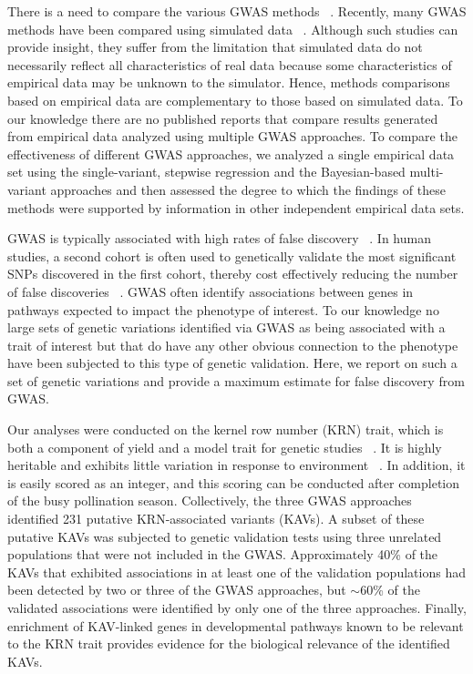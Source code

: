 \documentclass[10pt,letterpaper]{article}
\begin{document}
There is a need to compare the various GWAS methods ~\cite{Bush2012}.  Recently, many GWAS methods have been compared using simulated data ~\cite{Galesloot2014}. Although such studies can provide insight, they suffer from the limitation that simulated data do not necessarily reflect all characteristics of real data because some characteristics of empirical data may be unknown to the simulator. Hence, methods comparisons based on empirical data are complementary to those based on simulated data. To our knowledge there are no published reports that compare results generated from empirical data analyzed using multiple GWAS approaches. To compare the effectiveness of different GWAS approaches, we analyzed a single empirical data set using the single-variant, stepwise regression and the Bayesian-based multi-variant approaches and then assessed the degree to which the findings of these methods were supported by information in other independent empirical data sets.

GWAS is typically associated with high rates of false discovery ~\cite{Visscher2012}. In human studies, a second cohort is often used to genetically validate the most significant SNPs discovered in the first cohort, thereby cost effectively reducing the number of false discoveries ~\cite{Sladek2007}. GWAS often identify associations between genes in pathways expected to impact the phenotype of interest. To our knowledge no large sets of genetic variations identified via GWAS as being associated with a trait of interest but that do have any other obvious connection to the phenotype have been subjected to this type of genetic validation. Here, we report on such a set of genetic variations and provide a maximum estimate for false discovery from GWAS.  

Our analyses were conducted on the kernel row number (KRN) trait, which is both a component of yield and a model trait for genetic studies ~\cite{hallauer2010quantitative}. It is highly heritable and exhibits little variation in response to environment ~\cite{Lu2011}. In addition, it is easily scored as an integer, and this scoring can be conducted after completion of the busy pollination season. Collectively, the three GWAS approaches identified 231 putative KRN-associated variants (KAVs). A subset of these putative KAVs was subjected to genetic validation tests using three unrelated populations that were not included in the GWAS. Approximately 40\% of the KAVs that exhibited associations in at least one of the validation populations had been detected by two or three of the GWAS approaches, but $\sim$60\% of the validated associations were identified by only one of the three approaches. Finally, enrichment of KAV-linked genes in developmental pathways known to be relevant to the KRN trait provides evidence for the biological relevance of the identified KAVs. 
\end{document}
